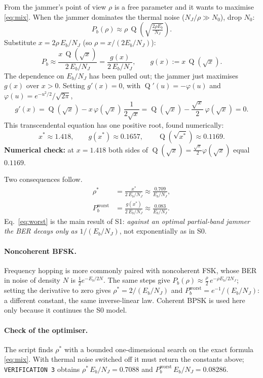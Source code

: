 \documentclass[11pt,a4paper]{article}
\newcommand{\Q}{\operatorname{Q}}
\newcommand{\EbNJ}{E_b/N_J}
\begin{document}
From the jammer's point of view $\rho$ is a free parameter and it wants to
maximise \eqref{eq:mix}. When the jammer dominates the thermal noise
($N_J/\rho \gg N_0$), drop $N_0$:
\[
  P_b(\rho) \approx \rho\,\Q\!\left(\sqrt{\tfrac{2\rho E_b}{N_J}}\right).
\]
Substitute $x = 2\rho\,\EbNJ$ (so $\rho = x/(2\EbNJ)$):
\[
  P_b \approx \frac{x\,\Q(\sqrt{x})}{2\,\EbNJ} = \frac{g(x)}{2\,\EbNJ},
  \qquad g(x) := x\,\Q(\sqrt x).
\]
The dependence on $\EbNJ$ has been pulled out; the jammer just maximises
$g(x)$ over $x>0$. Setting $g'(x)=0$, with $\Q'(u) = -\varphi(u)$ and
$\varphi(u)=e^{-u^2/2}/\sqrt{2\pi}$,
\[
  g'(x) = \Q(\sqrt x) - x\,\varphi(\sqrt x)\,\frac{1}{2\sqrt x}
        = \Q(\sqrt x) - \frac{\sqrt x}{2}\,\varphi(\sqrt x) = 0.
\]
This transcendental equation has one positive root, found numerically:
\[
  x^\ast \approx 1.418, \qquad g(x^\ast)\approx 0.1657, \qquad \Q(\sqrt{x^\ast}) \approx 0.1169 .
\]
\textbf{Numerical check:} at $x=1.418$ both sides of
$\Q(\sqrt x)=\tfrac{\sqrt x}{2}\varphi(\sqrt x)$ equal $0.1169$.

Two consequences follow.
\begin{align}
  \rho^\ast &= \frac{x^\ast}{2\,\EbNJ} \approx \frac{0.709}{\EbNJ}, \label{eq:rhostar}\\[2pt]
  P_b^{\text{worst}} &= \frac{g(x^\ast)}{2\,\EbNJ} \approx \frac{0.083}{\EbNJ}. \label{eq:worst}
\end{align}
Eq.~\eqref{eq:worst} is the main result of S1: \emph{against an optimal
partial-band jammer the BER decays only as $1/(\EbNJ)$}, not exponentially as
in S0. 

\paragraph{Noncoherent BFSK.}
Frequency hopping is more commonly paired with noncoherent FSK, whose BER in
noise of density $N$ is $\tfrac12 e^{-E_b/2N}$. The same steps give
$P_b(\rho)\approx\tfrac{\rho}{2}\,e^{-\rho E_b/2N_J}$; setting the derivative
to zero gives $\rho^\ast = 2/(\EbNJ)$ and
$P_b^{\text{worst}} = e^{-1}/(\EbNJ)$: a different constant, the same
inverse-linear law. Coherent BPSK is used here only because it continues the
S0 model.

\paragraph{Check of the optimiser.}
The script finds $\rho^\ast$ with a bounded one-dimensional search on the exact
formula \eqref{eq:mix}. With thermal noise switched off it must return the
constants above; \texttt{VERIFICATION 3} obtains
$\rho^\ast\,\EbNJ = 0.7088$ and $P_b^{\text{worst}}\,\EbNJ = 0.08286$.
\end{document}
